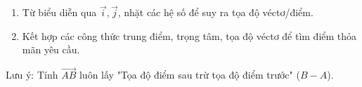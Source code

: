 \begin{enumerate}
\item Từ biểu diễn qua $\overrightarrow{i}, \overrightarrow{j}$, nhặt các hệ số để suy ra tọa độ véctơ/điểm.
\item Kết hợp các công thức trung điểm, trọng tâm, tọa độ véctơ để tìm điểm thỏa mãn yêu cầu.
\end{enumerate}
Lưu ý: Tính $\overrightarrow{AB}$ luôn lấy "Tọa độ điểm sau trừ tọa độ điểm trước" ($B - A$).
